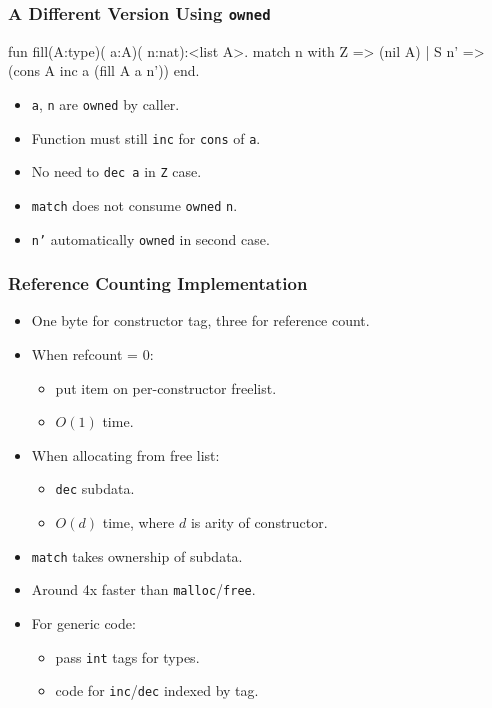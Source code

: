 \documentclass[11pt]{beamer}
\begin{document}
\begin{frame}[containsverbatim]
\frametitle{A Different Version Using \texttt{owned}}
\begin{code}
fun fill(A:type)( a:A)( n:nat):<list A>.
  match n with
    Z => (nil A)
  | S n' => (cons A inc a (fill A a n'))
  end.
\end{code}

\begin{itemize}
\item \texttt{a}, \texttt{n} are \texttt{owned} by caller.
\item Function must still \texttt{inc} for \texttt{cons} of \texttt{a}.
\item No need to \texttt{dec a} in \texttt{Z} case.
\item \texttt{match} does not consume \texttt{owned} \texttt{n}.
\item \texttt{n'} automatically \texttt{owned} in second case.
\end{itemize}
\end{frame}

\begin{frame}
\frametitle{Reference Counting Implementation}
\begin{itemize}
\item One byte for constructor tag, three for reference count.
\item When refcount = 0: 
\begin{itemize}
\item put item on per-constructor freelist.
\item $O(1)$ time.
\end{itemize}
\item When allocating from free list:
\begin{itemize}
\item \texttt{dec} subdata.
\item $O(d)$ time, where $d$ is arity of constructor.
\end{itemize}
\item \texttt{match} takes ownership of subdata.
\item Around 4x faster than \texttt{malloc}/\texttt{free}.
\item For generic code:
\begin{itemize}
\item pass \texttt{int} tags for types.
\item code for \texttt{inc}/\texttt{dec} indexed by tag.
\end{itemize}
\end{itemize}
\end{frame}
\end{document}
